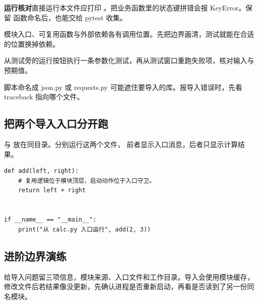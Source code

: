 \textbf{运行核对}\enspace 直接运行本文件应打印 。把业务函数里的状态键拼错会报 KeyError。保留  函数命名后，也能交给 pytest 收集。

\begin{myunderstanding}
模块入口、可复用函数与外部依赖各有调用位置。先把边界画清，测试就能在合适的位置换掉依赖。
\end{myunderstanding}

\begin{pycharmpractice}
从测试旁的运行按钮执行一条参数化测试，再从测试窗口重跑失败项，核对输入与预期值。
\end{pycharmpractice}

\begin{pitfall}
脚本命名成 json.py 或 requests.py 可能遮住要导入的库。报导入错误时，先看 traceback 指向哪个文件。
\end{pitfall}

\subsection*{把两个导入入口分开跑}
 与  放在同目录。分别运行这两个文件，
前者显示入口消息，后者只显示计算结果。


\begin{lstlisting}[title={\code{calc.py}}]
def add(left, right):
    # 复用逻辑位于模块顶层，启动动作位于入口守卫。
    return left + right


if __name__ == "__main__":
    print("从 calc.py 入口运行", add(2, 3))
\end{lstlisting}

\par

\subsection*{进阶边界演练}
给导入问题留三项信息，模块来源、入口文件和工作目录。导入会使用模块缓存，修改文件后若结果像没更新，先确认进程是否重新启动，再看是否读到了另一份同名模块。
